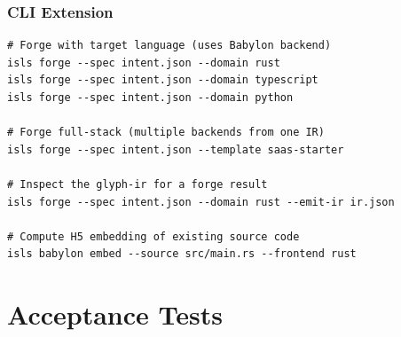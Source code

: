 \documentclass[11pt,a4paper,twoside]{article}
\theoremstyle{definition}
\theoremstyle{plain}
\theoremstyle{remark}
\begin{document}
\section{CLI Extension}\label{sec:cli}

\begin{lstlisting}
# Forge with target language (uses Babylon backend)
isls forge --spec intent.json --domain rust
isls forge --spec intent.json --domain typescript
isls forge --spec intent.json --domain python

# Forge full-stack (multiple backends from one IR)
isls forge --spec intent.json --template saas-starter

# Inspect the glyph-ir for a forge result
isls forge --spec intent.json --domain rust --emit-ir ir.json

# Compute H5 embedding of existing source code
isls babylon embed --source src/main.rs --frontend rust
\end{lstlisting}


\part{Acceptance Tests}\label{part:tests}
\end{document}
